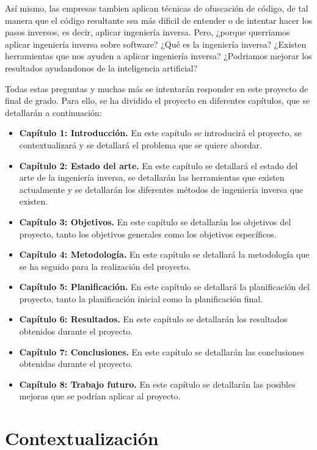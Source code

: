 Así mismo, las empresas tambien aplican técnicas de ofuscación de código, de tal
manera que el código resultante sea más dificil de entender o de intentar hacer los
pasos inversos, es decir, aplicar ingeniería inversa. Pero, ¿porque querriamos 
aplicar ingeniería inversa sobre software? ¿Qué es la ingeniería inversa? ¿Existen
herramientas que nos ayuden a aplicar ingeniería inversa? ¿Podriamos mejorar los
resultados ayudandonos de la inteligencia artificial?

Todas estas preguntas y muchas más se intentarán responder en este proyecto de final
de grado. Para ello, se ha dividido el proyecto en diferentes capítulos, que se
detallarán a continuación:

\begin{itemize}
    \item \textbf{Capítulo 1: Introducción.} En este capítulo se introducirá el proyecto, se contextualizará y se detallará el problema que se quiere abordar.
    \item \textbf{Capítulo 2: Estado del arte.} En este capítulo se detallará el estado del arte de la ingeniería inversa, se detallarán las herramientas que existen actualmente y se
                                                detallarán los diferentes métodos de ingeniería inversa que existen.
    \item \textbf{Capítulo 3: Objetivos.} En este capítulo se detallarán los objetivos del proyecto, tanto los objetivos generales como los objetivos específicos.
    \item \textbf{Capítulo 4: Metodología.} En este capítulo se detallará la metodología que se ha seguido para la realización del proyecto.
    \item \textbf{Capítulo 5: Planificación.} En este capítulo se detallará la planificación del proyecto, tanto la planificación inicial como la planificación final.
    \item \textbf{Capítulo 6: Resultados.} En este capítulo se detallarán los resultados obtenidos durante el proyecto.
    \item \textbf{Capítulo 7: Conclusiones.} En este capítulo se detallarán las conclusiones obtenidas durante el proyecto.
    \item \textbf{Capítulo 8: Trabajo futuro.} En este capítulo se detallarán las posibles mejoras que se podrían aplicar al proyecto.
\end{itemize}

\section{Contextualización}
\label{sec:contextualizacion}

